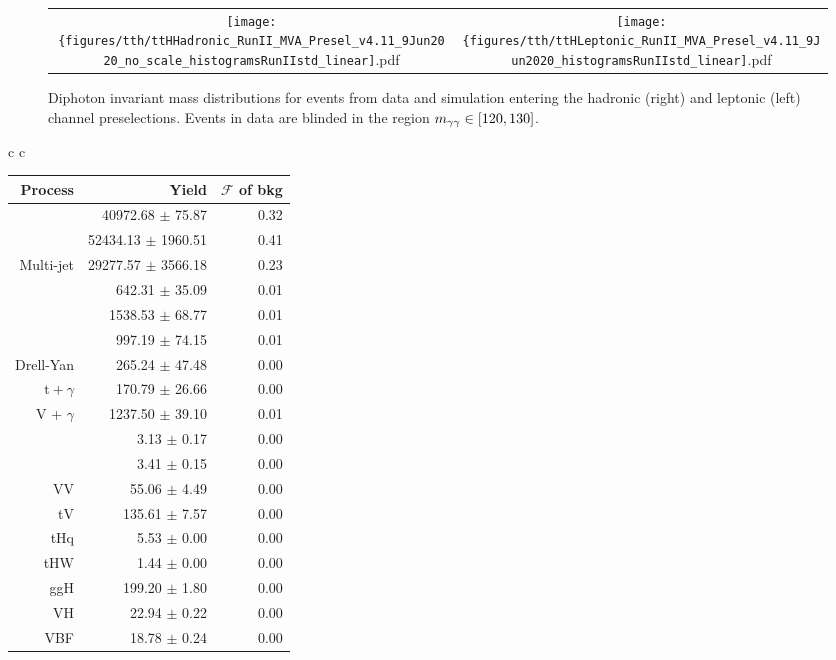 \begin{figure} [h!]
    \centering
    \begin{tabular}{c c}
        \texttt{[image: \{figures/tth/ttHHadronic\_RunII\_MVA\_Presel\_v4.11\_9Jun2020\_no\_scale\_histogramsRunIIstd\_linear]}.pdf} &
        \texttt{[image: \{figures/tth/ttHLeptonic\_RunII\_MVA\_Presel\_v4.11\_9Jun2020\_histogramsRunIIstd\_linear]}.pdf} 
    \end{tabular}
    \caption{Diphoton invariant mass distributions for events from data and simulation entering the hadronic (right) and leptonic (left) channel preselections. Events in data are blinded in the region $m_{\gamma\gamma} \in [120, 130]$.}
    \label{fig:tth_mgg_presel_datamc}
\end{figure}

\begin{table} [h!]
    \centering
    \begin{tabular}{c c}
    	\begin{tabular}{ r || r | r} \hline \hline
			Process & Yield & $\mathcal F$ of bkg \\ \hline
			\dipho & 40972.68 $\pm$ 75.87 & 0.32 \\ 
			\gjets & 52434.13 $\pm$ 1960.51 & 0.41 \\ 
			Multi-jet & 29277.57 $\pm$ 3566.18 & 0.23 \\ 
			\ttgg & 642.31 $\pm$ 35.09 & 0.01 \\ 
			\ttg & 1538.53 $\pm$ 68.77 & 0.01 \\ 
			\ttb & 997.19 $\pm$ 74.15 & 0.01 \\ 
			Drell-Yan & 265.24 $\pm$ 47.48 & 0.00 \\ 
			$\text{t} + \gamma$ & 170.79 $\pm$ 26.66 & 0.00 \\ 
			V + $\gamma$ & 1237.50 $\pm$ 39.10 & 0.01 \\ 
			\ttW & 3.13 $\pm$ 0.17 & 0.00 \\ 
			\ttZ & 3.41 $\pm$ 0.15 & 0.00 \\ 
			VV & 55.06 $\pm$ 4.49 & 0.00 \\ 
			tV & 135.61 $\pm$ 7.57 & 0.00 \\  \hline
			tHq & 5.53 $\pm$ 0.00 & 0.00 \\
            tHW & 1.44 $\pm$ 0.00 & 0.00 \\
			ggH & 199.20 $\pm$ 1.80 & 0.00 \\
            VH & 22.94 $\pm$ 0.22 & 0.00 \\
            VBF & 18.78 $\pm$ 0.24 & 0.00 \\ 

\end{tabular}
\end{tabular}
\end{table}
